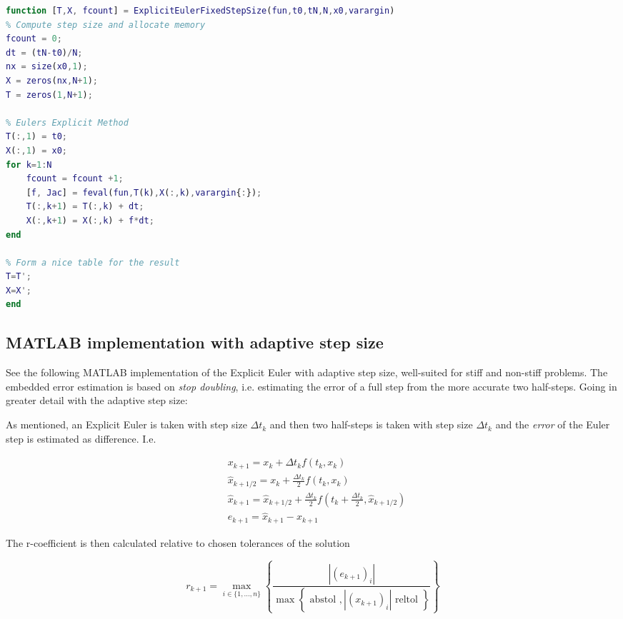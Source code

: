 \begin{adjustwidth*}{0cm}{-0.4cm}
\begin{lstlisting}[language=Matlab,caption=Explicit Euler (fixed step size), label=ExplicitEulerFixie]
function [T,X, fcount] = ExplicitEulerFixedStepSize(fun,t0,tN,N,x0,varargin)
% Compute step size and allocate memory
fcount = 0;
dt = (tN-t0)/N;
nx = size(x0,1);
X = zeros(nx,N+1);
T = zeros(1,N+1);

% Eulers Explicit Method
T(:,1) = t0;
X(:,1) = x0;
for k=1:N
    fcount = fcount +1;
    [f, Jac] = feval(fun,T(k),X(:,k),varargin{:});
    T(:,k+1) = T(:,k) + dt;
    X(:,k+1) = X(:,k) + f*dt;
end

% Form a nice table for the result
T=T';
X=X';
end
\end{lstlisting}
\end{adjustwidth*}

\subsection{MATLAB implementation with adaptive step size}
See the following MATLAB implementation of the Explicit Euler with adaptive step size, well-suited for stiff and non-stiff problems. The embedded error estimation is based on \textit{stop doubling}, i.e. estimating the error of a full step from the more accurate two half-steps. Going in greater detail with the adaptive step size:

As mentioned, an Explicit Euler is taken with step size $\Delta {t_k}$ and then two half-steps is taken with step size $\Delta t_k$ and the \textit{error} of the Euler step is estimated as difference. I.e. 

\begin{equation}
\begin{aligned}
&x_{k+1}=x_{k}+\Delta t_k f\left(t_{k}, x_{k}\right) \\
&\hat{x}_{k+1 / 2}=x_{k}+\frac{\Delta t_k}{2} f\left(t_{k}, x_{k}\right) \\
&\hat{x}_{k+1}=\hat{x}_{k+1 / 2}+\frac{\Delta t_k}{2} f\left(t_{k}+\frac{\Delta t_k}{2}, \hat{x}_{k+1 / 2}\right) \\
&e_{k+1}=\hat{x}_{k+1}-x_{k+1}
\end{aligned}
\end{equation}

The r-coefficient is then calculated relative to chosen tolerances of the solution

\begin{equation}
r_{k+1}=\max _{i \in\{1, \ldots, n\}}\left\{\frac{\left|\left(e_{k+1}\right)_{i}\right|}{\max \left\{\text { abstol },\left|\left(x_{k+1}\right)_{i}\right| \text { reltol }\right\}}\right\}
\end{equation}

